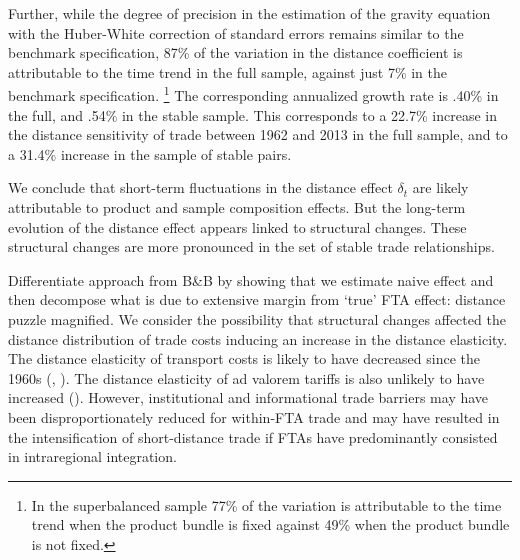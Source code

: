 \documentclass[12pt,twoside,a4paper,notitlepage]{article}
\begin{document}
Further, while the degree of precision in the estimation of the gravity equation with the Huber-White correction of standard errors remains similar to the benchmark specification, 87\% of the variation in the distance coefficient is attributable to the time trend in the full sample, against just 7\% in the benchmark specification.
\footnote{In the superbalanced sample 77\% of the variation is attributable to the time trend when the product bundle is fixed against 49\% when the product bundle is not fixed.}
The corresponding annualized growth rate is .40\% in the full, and .54\% in the stable sample.
This corresponds to a 22.7\% increase in the distance sensitivity of trade between 1962 and 2013 in the full sample, and to a 31.4\% increase in the sample of stable pairs.

We conclude that short-term fluctuations in the distance effect $\delta_t$ are likely attributable to product and sample composition effects.
But the long-term evolution of the distance effect appears linked to structural changes.
These structural changes are more pronounced in the set of stable trade relationships.


Differentiate approach from B\&B by showing that we estimate naive effect and then decompose what is due to extensive margin from `true' FTA effect: distance puzzle magnified.
We consider the possibility that structural changes affected the distance distribution of trade costs inducing an increase in the distance elasticity.
The distance elasticity of transport costs is likely to have decreased since the 1960s (\cite{Hummels2007}, \cite{Berthelon2008}).
The distance elasticity of ad valorem tariffs is also unlikely to have increased (\cite{Berthelon2008}).
However, institutional and informational trade barriers may have been disproportionately reduced for within-FTA trade and may have resulted in the intensification of short-distance trade if FTAs have predominantly consisted in intraregional integration.
\end{document}
